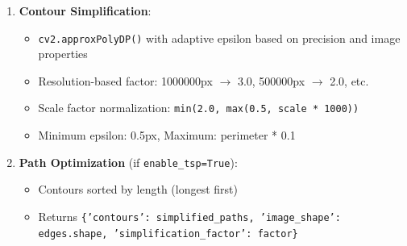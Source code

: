 \documentclass[a4paper,12pt]{article}
\begin{document}
\begin{enumerate}
\item \textbf{Contour Simplification}:
	\begin{itemize}
	\item \texttt{cv2.approxPolyDP()} with adaptive epsilon based on precision and image properties
	\item Resolution-based factor: 1000000px $\rightarrow$ 3.0, 500000px $\rightarrow$ 2.0, etc.
	\item Scale factor normalization: \texttt{min(2.0, max(0.5, scale * 1000))}
	\item Minimum epsilon: 0.5px, Maximum: perimeter * 0.1
	\end{itemize}

\item \textbf{Path Optimization} (if \texttt{enable\_tsp=True}):
	\begin{itemize}
	\item Contours sorted by length (longest first)
	\item Returns \texttt{\{'contours': simplified\_paths, 'image\_shape': edges.shape, 'simplification\_factor': factor\}}
	\end{itemize}
\end{enumerate}
\end{document}
